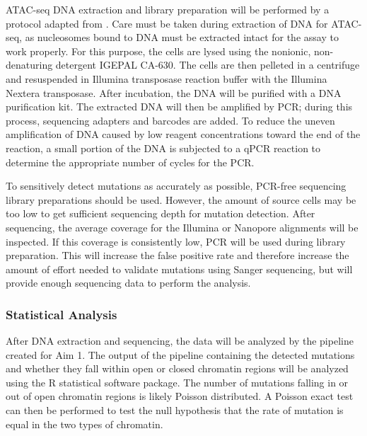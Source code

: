 ATAC-seq DNA extraction and library preparation will be performed by a protocol adapted from \cite{buenrostro_atac-seq:_2015}.
Care must be taken during extraction of DNA for ATAC-seq, as nucleosomes bound to DNA must be extracted intact for the assay to work properly. For this purpose, the cells are lysed using the nonionic, non-denaturing detergent IGEPAL CA-630. The cells are then pelleted in a centrifuge and resuspended in Illumina transposase reaction buffer with the Illumina Nextera transposase. After incubation, the DNA will be purified with a DNA purification kit. The extracted DNA will then be amplified by PCR; during this process, sequencing adapters and barcodes are added. To reduce the uneven amplification of DNA caused by low reagent concentrations toward the end of the reaction, a small portion of the DNA is subjected to a qPCR reaction to determine the appropriate number of cycles for the PCR.

To sensitively detect mutations as accurately as possible, PCR-free sequencing library preparations should be used. However, the amount of source cells may be too low to get sufficient sequencing depth for mutation detection. After sequencing, the average coverage for the Illumina or Nanopore alignments will be inspected. If this coverage is consistently low, PCR will be used during library preparation. This will increase the false positive rate and therefore increase the amount of effort needed to validate mutations using Sanger sequencing, but will provide enough sequencing data to perform the analysis.


\subsubsection{Statistical Analysis}

After DNA extraction and sequencing, the data will be analyzed by the pipeline created for Aim 1. The output of the pipeline containing the detected mutations and whether they fall within open or closed chromatin regions will be analyzed using the R statistical software package.
The number of mutations falling in or out of open chromatin regions is likely Poisson distributed. A Poisson exact test can then be performed to test the null hypothesis that the rate of mutation is equal in the two types of chromatin.

